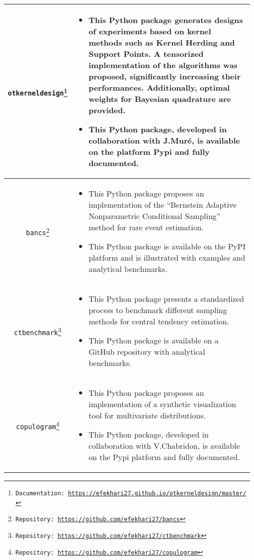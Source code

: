 \begin{center}
\small
\begin{tabularx}{\textwidth}{c >{\raggedleft\arraybackslash}X}
    \texttt{otkerneldesign\footnote{Documentation: \url{https://efekhari27.github.io/otkerneldesign/master/}}}
    &    
    \begin{itemize}[left=0pt]
        \item This Python package generates designs of experiments based on kernel methods such as Kernel Herding and Support Points. 
        A tensorized implementation of the algorithms was proposed, significantly increasing their performances. 
        Additionally, optimal weights for Bayesian quadrature are provided. 
        \item This Python package, developed in collaboration with J.Muré, is available on the platform Pypi and fully documented.
    \end{itemize}\\ \hline
    \texttt{bancs\footnote{Repository: \url{https://github.com/efekhari27/bancs}}} &    
    \begin{itemize}[left=0pt]
        \item This Python package proposes an implementation of the ``Bernstein Adaptive Nonparametric Conditional Sampling'' method for rare event estimation. 
        \item This Python package is available on the PyPI platform and is illustrated with examples and analytical benchmarks.
    \end{itemize}\\ \hline
    \texttt{ctbenchmark\footnote{Repository: \url{https://github.com/efekhari27/ctbenchmark}}} &    
    \begin{itemize}[left=0pt]
        \item This Python package presents a standardized process to benchmark different sampling methods for central tendency estimation. 
        \item This Python package is available on a GitHub repository with analytical benchmarks.
    \end{itemize}\\ \hline
    \texttt{copulogram\footnote{Repository: \url{https://github.com/efekhari27/copulogram}}} &    
    \begin{itemize}[left=0pt]
        \item This Python package proposes an implementation of a synthetic visualization tool for multivariate distributions. 
        \item This Python package, developed in collaboration with V.Chabridon, is available on the Pypi platform and fully documented.
    \end{itemize}\\
\end{tabularx} 
\end{center}




